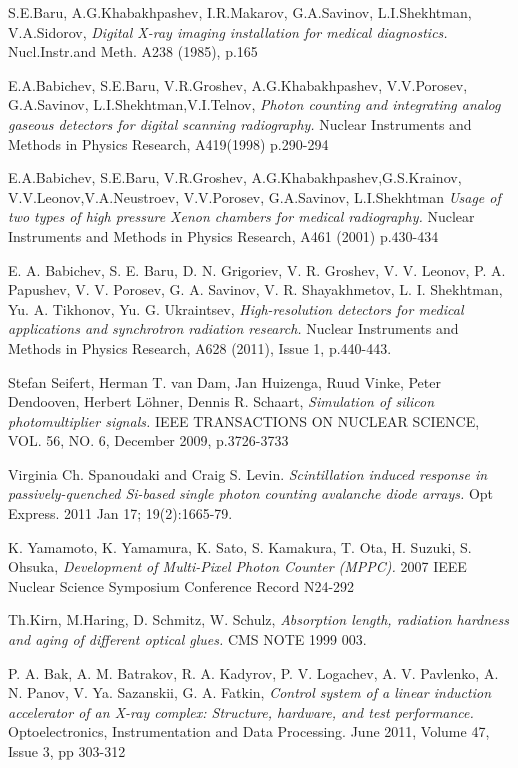 \documentclass{JINST}
\begin{document}
\newpage
\begin{thebibliography}{99}

S.E.Baru, A.G.Khabakhpashev, I.R.Makarov, G.A.Savinov, L.I.Shekhtman, V.A.Sidorov, \emph{Digital X-ray imaging installation for medical diagnostics.} Nucl.Instr.and Meth. A238 (1985), p.165

E.A.Babichev, S.E.Baru, V.R.Groshev, A.G.Khabakhpashev, V.V.Porosev, G.A.Savinov, L.I.Shekhtman,V.I.Telnov, \emph{Photon counting and integrating analog gaseous detectors for digital scanning radiography.} Nuclear Instruments and Methods in Physics Research, A419(1998) p.290-294

E.A.Babichev, S.E.Baru, V.R.Groshev, A.G.Khabakhpashev,G.S.Krainov, V.V.Leonov,V.A.Neustroev, V.V.Porosev, G.A.Savinov, L.I.Shekhtman
\emph{Usage of two types of high pressure Xenon chambers for medical radiography.} Nuclear Instruments and Methods in Physics Research, A461 (2001) p.430-434

E. A. Babichev, S. E. Baru, D. N. Grigoriev, V. R. Groshev, V. V. Leonov, P. A. Papushev, V. V. Porosev, G. A. Savinov, V. R. Shayakhmetov, L. I. Shekhtman, Yu. A. Tikhonov, Yu. G. Ukraintsev, \emph{High-resolution detectors for medical applications and synchrotron radiation research.} Nuclear Instruments and Methods in Physics Research, A628 (2011), Issue 1, p.440-443.

Stefan Seifert, Herman T. van Dam, Jan Huizenga, Ruud Vinke, Peter Dendooven, Herbert Löhner, Dennis R. Schaart, \emph{Simulation of silicon photomultiplier signals.} IEEE TRANSACTIONS ON NUCLEAR SCIENCE, VOL. 56, NO. 6, December 2009, p.3726-3733

Virginia Ch. Spanoudaki and Craig S. Levin. \emph{Scintillation induced response in passively-quenched Si-based single photon counting avalanche diode arrays.} Opt Express. 2011 Jan 17; 19(2):1665-79.

K. Yamamoto, K. Yamamura, K. Sato, S. Kamakura, T. Ota, H. Suzuki, S. Ohsuka, \emph{Development of Multi-Pixel Photon Counter (MPPC).} 2007 IEEE Nuclear Science Symposium Conference Record N24-292

Th.Kirn, M.Haring, D. Schmitz, W. Schulz, \emph{Absorption length, radiation hardness and aging of different optical glues.} CMS NOTE 1999 003.

P. A. Bak, A. M. Batrakov, R. A. Kadyrov, P. V. Logachev, A. V. Pavlenko, A. N. Panov, V. Ya. Sazanskii, G. A. Fatkin, \emph{Control system of a linear induction accelerator of an X-ray complex: Structure, hardware, and test performance.} Optoelectronics, Instrumentation and Data Processing. June 2011, Volume 47, Issue 3, pp 303-312


\end{thebibliography}
\end{document}
